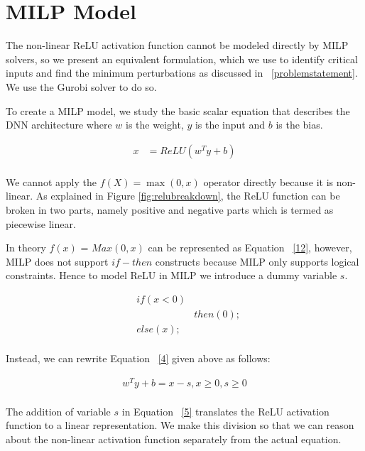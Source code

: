 \section{MILP Model}
The non-linear ReLU activation function cannot be modeled directly by MILP solvers, so we present an equivalent formulation, which we use to identify critical inputs and find the minimum perturbations as discussed in ~\ref{problemstatement}. 
We use the Gurobi solver to do so. 

 To create a \ac{MILP} model, we study the basic scalar equation that describes the \ac{DNN} architecture where $w$ is the weight, $y$ is the input and $b$ is the bias. 

\begin{equation}
\label{4}
\begin{aligned}
x &= ReLU(w^Ty + b) \\
\end{aligned}
\end{equation}
 

We cannot apply the $f(X) = \max(0, x)$ operator directly because it is non-linear. 
As explained in Figure \ref{fig:relubreakdown}, the ReLU function can be broken in two parts, namely positive and negative parts which is termed as piecewise linear. 

In theory $f(x)$ = $Max(0,x)$ can be represented as Equation ~\ref{12}, however, \ac{MILP} does not support $if-then$ constructs because \ac{MILP} only supports logical constraints. 
Hence to model ReLU in \ac{MILP} we introduce a dummy variable $s$. 
 

\begin{equation}
\label{12}
\begin{aligned}
& if (x < 0) \\
& & then(0); \\
& else (x);	 \\
\end{aligned}
\end{equation}


Instead, we can rewrite Equation ~\ref{4} given above as follows:

\begin{equation}
\label{5}
\begin{aligned}
w^Ty + b = x - s, x \geq 0, s \geq 0 \\
\end{aligned}
\end{equation}


The addition of variable $s$ in Equation ~\ref{5} translates the ReLU activation function to a linear representation.
We make this division so that we can reason about the non-linear activation function separately from the actual equation. 

